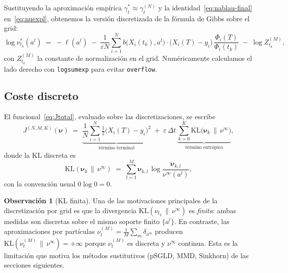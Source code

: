 \documentclass[11pt, a4paper]{article}
\theoremstyle{definition}
\newtheorem{remark}{Observación}[section]
\newcommand{\eps}{\varepsilon}
\begin{document}
Sustituyendo la aproximación empírica
$\gamma_t^* \approx \gamma_t^{(N)}$ y la
identidad~\eqref{eq:nablau-final} en~\eqref{eq:nuexpl}, obtenemos la
versión discretizada de la fórmula de Gibbs sobre el grid:
\begin{equation}
  \log \nu_{t_k}^*(a^l)
  \;=\;
  -\ell(a^l)
  \;-\;
  \frac{1}{\eps N}
  \sum_{i=1}^{N}
    b\bigl( X_i(t_k), a^l \bigr)
    \cdot
    \bigl( X_i(T) - y_i \bigr) \,
    \frac{\Phi_i(T)}{\Phi_i(t_k)}
  \;-\;
  \log Z_{t_k}^{(M)},
  \label{eq:nuexpl-discret}
\end{equation}
con $Z_{t_k}^{(M)}$ la constante de normalización en el grid. Numéricamente
calculamos el lado derecho con \texttt{logsumexp} para evitar
\texttt{overflow}.

\subsection{Coste discreto}
\label{ssec:coste}

El funcional~\eqref{eq:Jtotal}, evaluado sobre las discretizaciones,
se escribe
\begin{equation}
  J^{(N, M, K)}(\boldsymbol{\nu})
  \;=\;
  \underbrace{\frac{1}{N} \sum_{i=1}^{N} \tfrac{1}{2}\bigl( X_i(T) - y_i \bigr)^2}_{\text{término terminal}}
  \;+\;
  \eps \, \Delta t \,
  \underbrace{\sum_{k=0}^{K} \mathrm{KL}\bigl( \boldsymbol{\nu}_k \,\|\, \nu^{\infty} \bigr)}_{\text{término entrópico}},
\end{equation}
donde la KL discreta es
\begin{equation}
  \mathrm{KL}(\boldsymbol{\nu}_k \,\|\, \nu^{\infty})
  \;=\;
  \sum_{l=1}^{M} \boldsymbol{\nu}_{k, l}
  \,\log\!\frac{\boldsymbol{\nu}_{k, l}}{\nu^{\infty}(a^l)},
\end{equation}
con la convención usual $0 \log 0 = 0$.

\begin{remark}[KL finita]
Una de las motivaciones principales de la discretización por grid es
que la divergencia $\mathrm{KL}(\nu_{t_k} \,\|\, \nu^{\infty})$ es
\emph{finita}: ambas medidas son discretas sobre el mismo soporte
finito $\{a^l\}$. En contraste, las aproximaciones por partículas
$\nu_t^{(M)} = \tfrac{1}{M}\sum_m \delta_{a^m}$ producen
$\mathrm{KL}(\nu_t^{(M)} \,\|\, \nu^{\infty}) = +\infty$ porque
$\nu_t^{(M)}$ es discreta y $\nu^{\infty}$ continua. Esta es la
limitación que motiva los métodos sustitutivos (pSGLD, MMD, Sinkhorn)
de las secciones siguientes.
\end{remark}
\end{document}
